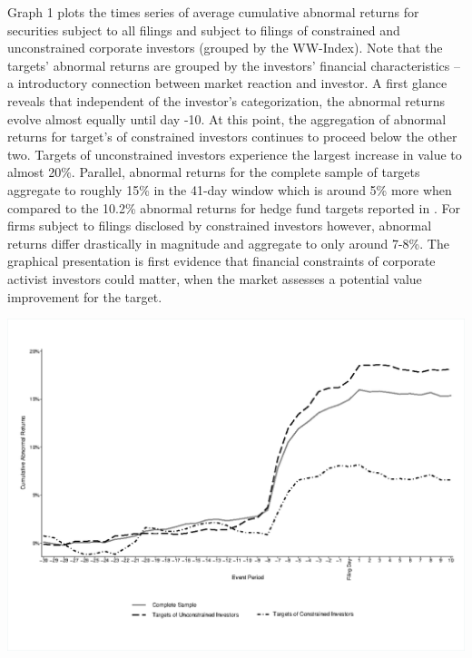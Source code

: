 \documentclass[12pt]{article}
\begin{document}
Graph 1 plots the times series of average cumulative abnormal returns for securities subject to all filings and subject to filings of constrained and unconstrained corporate investors (grouped by the WW-Index). Note that the targets' abnormal returns are grouped by the investors' financial characteristics -- a introductory connection between market reaction and investor. A first glance reveals that independent of the investor's categorization, the abnormal returns evolve almost equally until day -10. At this point, the aggregation of  abnormal returns for target's of constrained investors continues to proceed below the other two. Targets of unconstrained investors experience the largest increase in value to almost 20\%. Parallel, abnormal returns for the complete sample of targets aggregate to roughly 15\% in the 41-day window which is around 5\% more when compared to the 10.2\% abnormal returns for hedge fund targets reported in \citet[p.208]{Klein2009}.
For firms subject to filings disclosed by constrained investors however, abnormal returns differ drastically in magnitude and aggregate to only around 7-8\%. The graphical presentation is first evidence that financial constraints of corporate activist investors could matter, when the market assesses a potential value improvement for the target.
\begin{table}
	\centering
	\begin{adjustbox}{max width=\textwidth}
		\includegraphics{WW-TimeS_copy.eps} \label{AR}
	\end{adjustbox}
\end{table}
\end{document}
